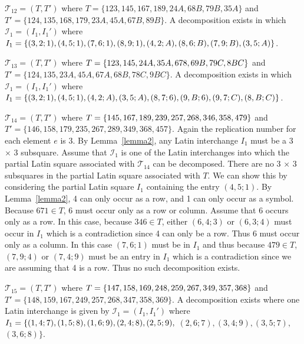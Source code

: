 \documentclass[12pt]{report}
\begin{document}
 ${\mathcal T}_{12}=(T,T')$ 
where $T=\{1 2 3,1 4 5,1 6 7,1 8 9,2 4 A,6 8 B,7 9 B,
3 5 A\}$ and 
$T'=\{1 2 4,1 3 5,1 6 8,1 7 9,2 3 A,4 5 A,6 7 B,8 9 B \}$.
A decomposition exists in which
$\mathcal{I}_1 = (I_1,I_1')$ where 
$I_1=\{(3, 2; 1),(4, 5; 1),
(7, 6; 1),
(8, 9; 1),(4, 2; A),
(8, 6; B),(7, 9; B),\break (3, 5; A)\}$.
\vspace{0.5cm}

 ${\mathcal T}_{13}=(T,T')$ 
where $T=\{1 2 3,1 4 5,2 4 A,3 5 A,6 7 8,6 9 B,7 9 C,\break
8 B C\}$ 
and $T'=\{1 2 4,1 3 5,2 3 A,4 5 A,6 7 A,6 8 B,7 8 C,9 B C\}$.
A decomposition exists in which
$\mathcal{I}_1 = (I_1,I_1')$ where 
$I_1=\{(3, 2; 1),(4, 5; 1),
(4, 2; A),
(3, 5; A),
(8, 7; 6),\break (9, B; 6),(9, 7; C),(8, B; C)\}$.

 ${\mathcal T}_{14}=(T,T')$ 
where $T=\{1 4 5,1 6 7,1 8 9,2 3 9,2 5 7,2 6 8,
3 4 6,
3 5 8,\break 4 7 9 \}$ 
and $T'=\{1 4 6,1 5 8,1 7 9,2 3 5,2 6 7,2 8 9,3 4 9,3 6 8,4 5 7 \}$.  
Again the replication number for each element $e$ is 3.  By Lemma~\ref{lemma2}, 
any Latin interchange $I_1$ must be a 3 $\times$ 3 subsquare.
Assume that ${\mathcal I}_1$ is one of the Latin interchanges into
which the partial Latin square associated with ${\mathcal T}_{14}$ can
be decomposed.  
There are no 3 $\times$ 3 subsquares in the partial Latin square associated 
with $T$.  We can show this by considering the partial Latin square $I_1$ 
containing
the entry $(4, 5; 1)$.  By Lemma~\ref {lemma2}, 4 can only occur as 
a row, and 1 can only occur as a symbol.  Because $671 \in T$,
6 must occur only as a row or column.
Assume that 6 occurs only as a row.  In this
case, because $346 \in T$, either $(6, 4; 3)$ or $(6, 3; 4)$ 
must occur in $I_1$ which is a contradiction since 4 can only be a row. 
Thus 6 must occur only as a column.  In this case $(7, 6; 1)$ 
must be in $I_1$ and thus because $479 \in T$, $(7, 9; 4)$
or $(7, 4; 9)$ must be an entry in $I_1$ which is a contradiction
since we are assuming that 4 is a row. Thus no such decomposition exists.
\vspace{0.5cm}

 ${\mathcal T}_{15}=(T,T')$ 
where $T=\{1 4 7,1 5 8,1 6 9,2 4 8,2 5 9,2 6 7,3 4 9,\break 
3 5 7,3 6 8\}$ and
$T'=\{1 4 8,1 5 9,1 6 7,2 4 9,2 5 7,2 6 8,3 4 7,3 5 8,3 6 9 \}$.
A decomposition exists where one Latin interchange is given by 
$\mathcal{I}_1 = (I_1,I_1')$ where 
$I_1=\{(1,4;7),\break
(1,5;8),
(1,6; 9),(2,4; 8),(2,5;9),$
$(2,6;7),
(3,4;9),(3,5;7),$ $(3,6;8)\}$.
\vspace{0.5cm}
\end{document}
